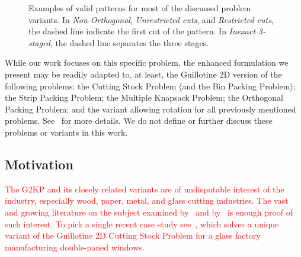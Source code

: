 \documentclass[smallextended]{svjour3}       %
\newif\iffinalversion
\newcommand{\oldtext}[1]{\iffinalversion%
\else%
\textcolor{red}{#1}%
\fi%
}
\begin{document}
\begin{figure}

\caption{Examples of valid patterns for most of the discussed problem variants. In \emph{Non-Orthogonal}, \emph{Unrestricted cuts}, and \emph{Restricted cuts}, the dashed line indicate the first cut of the pattern. In \emph{Inexact 3-staged}, the dashed line separates the three stages.}
\label{fig:qualifier_examples}
\end{figure}

While our work focuses on this specific problem, the enhanced formulation we present may be readily adapted to, at least, the Guillotine 2D version of the following problems: the Cutting Stock Problem (and the Bin Packing Problem); the Strip Packing Problem; the Multiple Knapsack Problem; the Orthogonal Packing Problem; and the variant allowing rotation for all previously mentioned problems.
See~\cite{furini:2016} for more details.
We do not define or further discuss these problems or variants in this work.

\subsection{Motivation}

\oldtext{The G2KP and its closely related variants are of undisputable interest of the industry, especially wood, paper, metal, and glass cutting industries. The vast and growing literature on the subject examined by~\cite{iori:2020} and by~\cite{russo:2020} is enough proof of such interest.
To pick a single recent case study see~\cite{clautiaux:2019}, which solves a unique variant of the Guillotine 2D Cutting Stock Problem for a glass factory manufacturing double-paned windows.}
\end{document}
